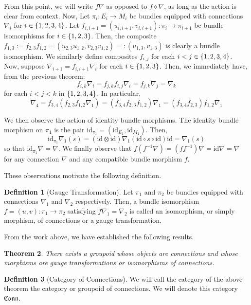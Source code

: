 \documentclass{amsart}
\newcommand{\tensor}{\otimes}
\renewcommand{\to}[1][]{\stackrel{#1}{\longrightarrow}}
\newcommand{\id}{\text{id}}
\newcommand{\curly}[1]{\left\{ #1 \right\}}
\newcommand{\set}[2][]{\ifthenelse{\equal{#1}{}}
                                  {\curly{#2}}
                                  {\curly{#1\ \textbf{:}\ #2}}}
\newcommand{\Conn}{\mathfrak{Conn}}
\newtheorem{thm}{Theorem}
\numberwithin{thm}{section}
\theoremstyle{definition}
\newtheorem{defn}[thm]{Definition}
\begin{document}
From this point, we will write $f\nabla$ as opposed to $f \diamond \nabla$,
as long as the action is clear from context. Now, Let $\pi_i : E_i \to M_i$ be
bundles equipped with connections
$\nabla_i$ for $i \in \set{1, 2, 3, 4}$. Let
$f_{i, i + 1} = (u_{i, i + 1}, v_{i, i + 1}) : \pi_{i} \to \pi_{i + 1}$
be bundle isomorphisms for $i \in \set{1, 2, 3}$. Then, the composite
$f_{1, 3} := f_{2, 3}f_{1, 2} = (u_{2, 3}u_{1, 2}, v_{2, 3}v_{1, 2})
=: (u_{1, 3}, v_{1, 3})$ is clearly a bundle isomorphism. We similarly define
composites $f_{i, j}$ for each $i < j \in \set{1, 2, 3, 4}$. Now, suppose
$\nabla_{i + 1} = f_{i, i + 1}\nabla_i$ for each $i \in \set{1, 2, 3}$. Then, we
immediately have, from the previous theorem:
\[
  f_{i, k}\nabla_i = f_{j, k}f_{i, j}\nabla_i = f_{j, k}\nabla_j = \nabla_k
\]
for each $i < j < k$ in $\set{1, 2, 3, 4}$. In particular,
\[
  \nabla_4
    = f_{3, 4}(f_{2, 3}f_{1, 2}\nabla_1)
    = (f_{3,4}f_{2,3}f_{1,2}) \nabla_1
    = (f_{3, 4}f_{2, 3})f_{1, 2}\nabla_1
\]

We then observe the action of identity bundle morphisms. The identity bundle
morphism on $\pi_1$ is the pair $\id_{\pi_1} = (\id_{E_1}, \id_{M_1})$. Then,
\[
  \id_{\pi_1}\nabla_1(s)
    = (\id \tensor \id) \nabla_1(\id \circ s \circ \id) \id
    = \nabla_1(s)
\]
so that $\id_{\pi_1}\nabla = \nabla$. We finally observe that
$f(f^{-1}\nabla) = (ff^{-1})\nabla = \id\nabla = \nabla$ for any connection
$\nabla$ and any compatible bundle morphism $f$.

These observations motivate the following definition.
\begin{defn}[Gauge Transformation]
Let $\pi_1$ and $\pi_2$ be bundles equipped with connections $\nabla_1$ and
$\nabla_2$ respectively. Then, a bundle isomorphism
$f = (u, v) : \pi_1 \to \pi_2$ satisfying $f\nabla_1 = \nabla_2$ is called an
isomorphism, or simply morphism, of connections or a gauge transformation.
\end{defn}

From the work above, we have established the following results.
\begin{thm}
There exists a groupoid whose objects are connections and
whose morphisms are gauge transformations or isomorphisms of connections.
\end{thm}
\begin{defn}[Category of Connections]
We will call the category of the above theorem the category or groupoid of
connections. We will denote this category $\Conn$.
\end{defn}
\end{document}
